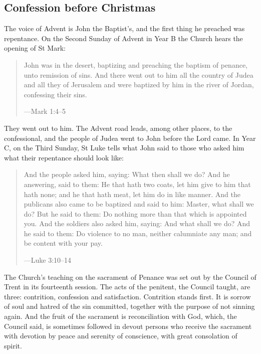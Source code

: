 \subsection{Confession before Christmas}\label{sec:confession}

The voice of Advent is John the Baptist's, and the first thing he preached was
repentance. On the Second Sunday of Advent in Year B the Church hears the
opening of St Mark:

\begin{quote}
John was in the desert, baptizing and preaching the baptism of penance, unto
remission of sins. And there went out to him all the country of Judea and all
they of Jerusalem and were baptized by him in the river of Jordan, confessing
their sins.\par
{\smallskip\noindent\small ---Mark 1:4--5\par}
\end{quote}

\noindent They went out to him. The Advent road leads, among other places, to
the confessional, and the people of Judea went to John before the Lord came.
In Year C, on the Third Sunday, St Luke tells what John said to those who asked
him what their repentance should look like:

\begin{quote}
And the people asked him, saying: What then shall we do? And he answering, said
to them: He that hath two coats, let him give to him that hath none; and he that
hath meat, let him do in like manner. And the publicans also came to be baptized
and said to him: Master, what shall we do? But he said to them: Do nothing more
than that which is appointed you. And the soldiers also asked him, saying: And
what shall we do? And he said to them: Do violence to no man, neither calumniate
any man; and be content with your pay.\par
{\smallskip\noindent\small ---Luke 3:10--14\par}
\end{quote}

The Church's teaching on the sacrament of Penance was set out by the Council of
Trent in its fourteenth session. The acts of the penitent, the Council taught,
are three: contrition, confession and satisfaction. Contrition stands first. It
is sorrow of soul and hatred of the sin committed, together with the purpose of
not sinning again. And the fruit of the sacrament is reconciliation with God,
which, the Council said, is sometimes followed in devout persons who receive
the sacrament with devotion by peace and serenity of conscience, with great
consolation of spirit.

